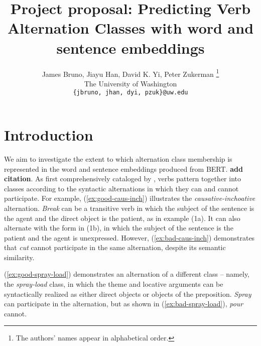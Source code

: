 \documentclass[11pt]{article}
\title{Project proposal: Predicting Verb Alternation Classes with word and sentence embeddings}
\author{James Bruno, Jiayu Han, David K. Yi, Peter Zukerman \thanks{The authors' names appear in alphabetical order.}\\
The University of Washington\\
  \texttt{\{jbruno, jhan, dyi, pzuk\}@uw.edu}}
\begin{document}
\maketitle

\section{Introduction}

We aim to investigate the extent to which alternation class membership is represented in the word and sentence embeddings produced from BERT. \textbf{add citation}.  As first comprehensively cataloged by \citet{levin1993}, verbs pattern together into classes according to the syntactic alternations in which they can and cannot participate.  For example, (\ref{ex:good-caus-inch}) illustrates the \emph{causative-inchoative} alternation.  \emph{Break} can be a transitive verb in which the subject of the sentence is the agent and the direct object is the patient, as in example (1a).  It can also alternate with the form in (1b), in which the subject of the sentence is the patient and the agent is unexpressed. %
However, (\ref{ex:bad-caus-inch}) demonstrates that \emph{cut} cannot participate in the same alternation, despite its semantic similarity.

\begin{exe}
    \ex
        \label{ex:good-caus-inch}
        \begin{xlist}
        \end{xlist}

    \ex
        \label{ex:bad-caus-inch}
        \begin{xlist}
        \end{xlist}
\end{exe}

(\ref{ex:good-spray-load}) demonstrates an alternation of a different class -- namely, the \emph{spray-load} class, in which the theme and locative arguments can be syntactically realized as either direct objects or objects of the preposition.  \emph{Spray} can participate in the alternation, but as shown in (\ref{ex:bad-spray-load}), \emph{pour} cannot.

\begin{exe}
    \ex 
        \label{ex:good-spray-load}
        \begin{xlist}
        \end{xlist}

    \ex 
        \label{ex:bad-spray-load}
        \begin{xlist}
        \end{xlist}
\end{exe}
\end{document}

